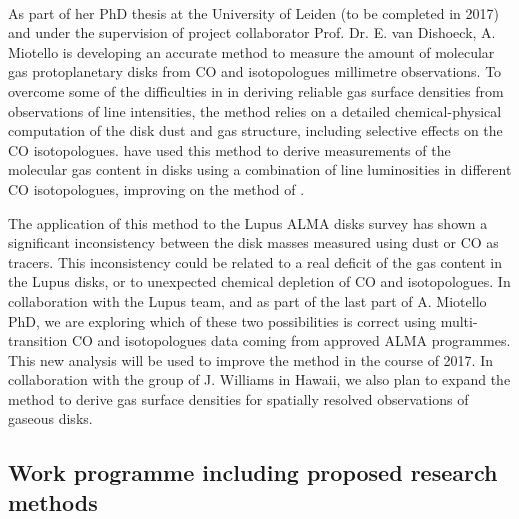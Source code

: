 \documentclass[10pt,fleqn,twoside]{article}
\begin{document}
\vspace{1em}{\Tcol\bf Disk gas masses from ALMA observations}\\
As part of her PhD thesis at the University of Leiden (to be completed in 2017) and under the supervision of project collaborator Prof. Dr. E. van Dishoeck, A. Miotello is developing an accurate method to measure the amount of molecular gas protoplanetary disks from CO and isotopologues millimetre observations. To overcome some of the difficulties in in deriving reliable gas surface densities from observations of line intensities, the method relies on a detailed chemical-physical computation of the disk dust and gas structure, including selective effects on the CO isotopologues. \citet{2016A&A...594A..85M} have used this method to derive measurements of the molecular gas content in disks using a combination of line luminosities in different CO isotopologues, improving on the method of \citet{2014ApJ...788...59W}.

The application of this method to the Lupus ALMA disks survey \citet[][see also Fig.~\ref{f_LADS}]{2016arXiv161201538M} has shown a significant inconsistency between the disk masses measured using dust or CO as tracers. This inconsistency could be related to a real deficit of the gas content in the Lupus disks, or to unexpected chemical depletion of CO and isotopologues. In collaboration with the Lupus team, and as part of the last part of A. Miotello PhD, we are exploring which of these two possibilities is correct using multi-transition CO and isotopologues data coming from approved ALMA programmes. This new analysis will be used to improve the method in the course of 2017. In collaboration with the group of J. Williams in Hawaii, we also plan to expand the method to derive gas surface densities for spatially resolved observations of gaseous disks.

\subsection{Work programme including proposed research methods}
\label{s_work}


\end{document}
